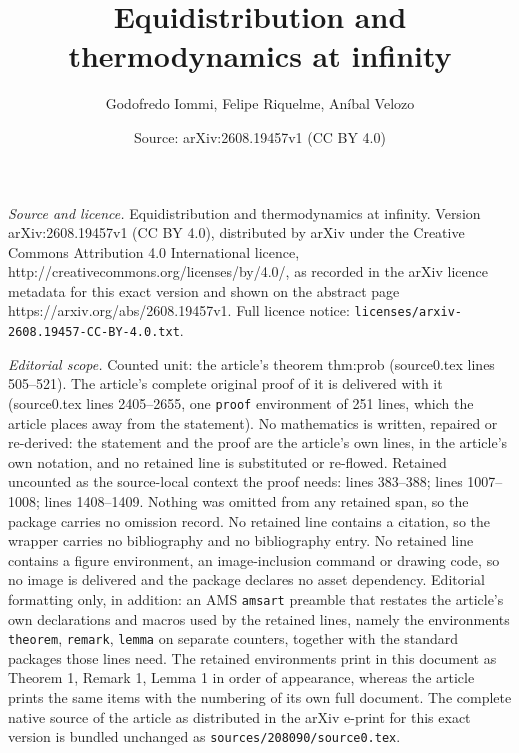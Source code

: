 \documentclass[10pt,a4paper]{amsart}
\title{Equidistribution and thermodynamics at infinity}
\author{Godofredo Iommi, Felipe Riquelme, An\'ibal Velozo}
\date{Source: arXiv:2608.19457v1 (CC BY 4.0)}
\begin{document}
\maketitle

\noindent\emph{Source and licence.} Equidistribution and thermodynamics at infinity. Version arXiv:2608.19457v1 (CC BY 4.0), distributed by arXiv under the Creative Commons Attribution 4.0 International licence, http://creativecommons.org/licenses/by/4.0/, as recorded in the arXiv licence metadata for this exact version and shown on the abstract page https://arxiv.org/abs/2608.19457v1. Full licence notice: \texttt{licenses/arxiv-2608.19457-CC-BY-4.0.txt}.\par\smallskip

\noindent\textit{Editorial scope.} Counted unit: the article's theorem thm:prob (source0.tex lines 505--521). The article's complete original proof of it is delivered with it (source0.tex lines 2405--2655, one \texttt{proof} environment of 251 lines, which the article places away from the statement). No mathematics is written, repaired or re-derived: the statement and the proof are the article's own lines, in the article's own notation, and no retained line is substituted or re-flowed.  Retained uncounted as the source-local context the proof needs: lines 383--388; lines 1007--1008; lines 1408--1409.  Nothing was omitted from any retained span, so the package carries no omission record.  No retained line contains a citation, so the wrapper carries no bibliography and no bibliography entry.  No retained line contains a figure environment, an image-inclusion command or drawing code, so no image is delivered and the package declares no asset dependency.  Editorial formatting only, in addition: an AMS \texttt{amsart} preamble that restates the article's own declarations and macros used by the retained lines, namely the environments \texttt{theorem}, \texttt{remark}, \texttt{lemma} on separate counters, together with the standard packages those lines need.  The retained environments print in this document as Theorem 1, Remark 1, Lemma 1 in order of appearance, whereas the article prints the same items with the numbering of its own full document.  The complete native source of the article as distributed in the arXiv e-print for this exact version is bundled unchanged as \texttt{sources/208090/source0.tex}.
\end{document}
